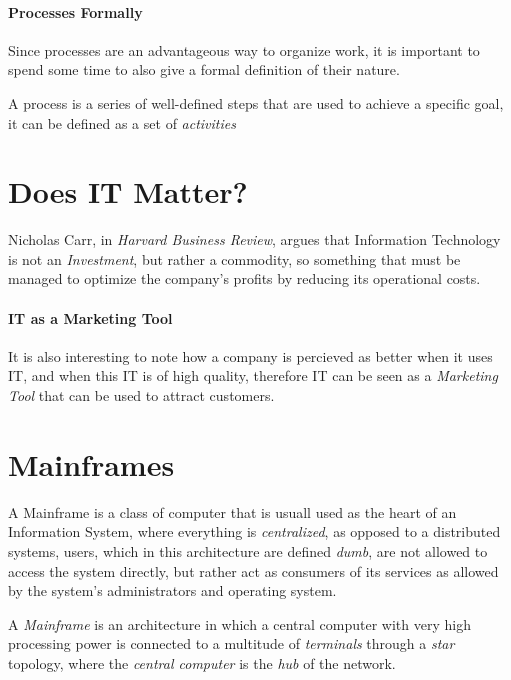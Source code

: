 \documentclass[openright, twoside, twocolumn, a4paper, 10pt]{report}
\begin{document}
\paragraph{Processes Formally}
Since processes are an advantageous way to organize work, it is important to spend some time to
also give a formal definition of their nature.

\begin{definition}\label{def:proc}
	A process is a series of well-defined steps that are used to achieve a specific goal, it can
	be defined as a set of \emph{activities}
\end{definition}

\section{Does IT Matter?}
Nicholas Carr, in \emph{Harvard Business Review}, argues that Information Technology is not an \emph{Investment},
but rather a commodity, so something that must be managed to optimize the company's profits by reducing its
operational costs.

\paragraph{IT as a Marketing Tool}
It is also interesting to note how a company is percieved as better when it uses IT, and when this IT is
of high quality, therefore IT can be seen as a \emph{Marketing Tool} that can be used to attract customers.


\section{Mainframes}

A Mainframe is a class of computer that is usuall used as the heart of an Information System, where
everything is \emph{centralized}, as opposed to a distributed systems, users, which in this
architecture are defined \emph{dumb}, are not allowed to access the system directly, but rather
act as consumers of its services as allowed by the system's administrators and operating system.

\begin{definition}\label{def:mainf}
	A \emph{Mainframe} is an architecture in which a central computer with very high
	processing power is connected to a multitude of \emph{terminals} through a
	\emph{star} topology, where the \emph{central computer} is the \emph{hub} of the
	network.
\end{definition}
\end{document}
